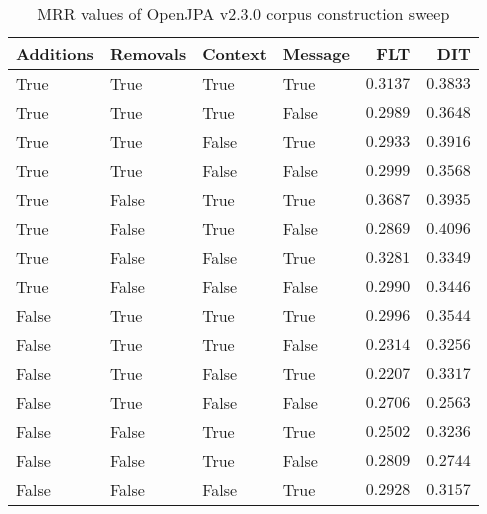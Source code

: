 
\begin{table}
\begin{spacing}{1.2}
\centering
\caption{MRR values of OpenJPA v2.3.0 corpus construction sweep}
\label{table:openjpa_corpus_sweep}
\vspace{0.2em}
\begin{tabular}{llll|rr}
\toprule
Additions & Removals & Context & Message & FLT &        DIT \\
\midrule
     True &     True &    True &    True &         $0.3137$ &      $0.3833$ \\
     True &     True &    True &   False &         $0.2989$ &      $0.3648$ \\
     True &     True &   False &    True &         $0.2933$ &      $0.3916$ \\
     True &     True &   False &   False &         $0.2999$ &      $0.3568$ \\
     True &    False &    True &    True &    $\bm{0.3687}$ &      $0.3935$ \\
     True &    False &    True &   False &         $0.2869$ & $\bm{0.4096}$ \\
     True &    False &   False &    True &         $0.3281$ &      $0.3349$ \\
     True &    False &   False &   False &         $0.2990$ &      $0.3446$ \\
    False &     True &    True &    True &         $0.2996$ &      $0.3544$ \\
    False &     True &    True &   False &         $0.2314$ &      $0.3256$ \\
    False &     True &   False &    True &         $0.2207$ &      $0.3317$ \\
    False &     True &   False &   False &         $0.2706$ &      $0.2563$ \\
    False &    False &    True &    True &         $0.2502$ &      $0.3236$ \\
    False &    False &    True &   False &         $0.2809$ &      $0.2744$ \\
    False &    False &   False &    True &         $0.2928$ &      $0.3157$ \\
\bottomrule
\end{tabular}

\end{spacing}
\end{table}
